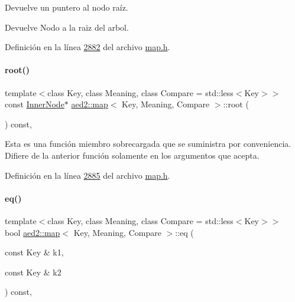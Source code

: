 Devuelve un puntero al nodo raíz. 

\begin{DoxyReturn}{Devuelve}
Nodo a la raiz del arbol. 
\end{DoxyReturn}


Definición en la línea \hyperlink{map_8h_source_l02882}{2882} del archivo \hyperlink{map_8h_source}{map.\+h}.

\mbox{\label{classaed2_1_1map_a66fe019d885578cc52949409f80858eb_a66fe019d885578cc52949409f80858eb}} 
\paragraph{\texorpdfstring{root()}{root()}\hspace{0.1cm}{\footnotesize\ttfamily [2/2]}}
{\footnotesize\ttfamily template$<$class Key, class Meaning, class Compare = std\+::less$<$\+Key$>$$>$ \\
const \hyperlink{structaed2_1_1map_1_1InnerNode}{Inner\+Node}$\ast$ \hyperlink{classaed2_1_1map}{aed2\+::map}$<$ Key, Meaning, Compare $>$\+::root (\begin{DoxyParamCaption}{ }\end{DoxyParamCaption}) const\hspace{0.3cm}{\ttfamily [inline]}, {\ttfamily [private]}}

Esta es una función miembro sobrecargada que se suministra por conveniencia. Difiere de la anterior función solamente en los argumentos que acepta. 

Definición en la línea \hyperlink{map_8h_source_l02885}{2885} del archivo \hyperlink{map_8h_source}{map.\+h}.

\mbox{\label{classaed2_1_1map_aebf6c09c424c39a874798165401b309e_aebf6c09c424c39a874798165401b309e}} 
\paragraph{\texorpdfstring{eq()}{eq()}}
{\footnotesize\ttfamily template$<$class Key, class Meaning, class Compare = std\+::less$<$\+Key$>$$>$ \\
bool \hyperlink{classaed2_1_1map}{aed2\+::map}$<$ Key, Meaning, Compare $>$\+::eq (\begin{DoxyParamCaption}\item[{const Key \&}]{k1,  }\item[{const Key \&}]{k2 }\end{DoxyParamCaption}) const\hspace{0.3cm}{\ttfamily [inline]}, {\ttfamily [private]}}



